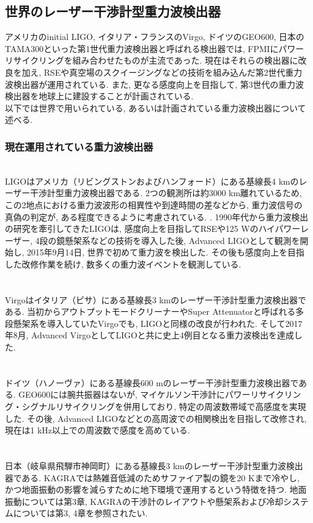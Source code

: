 \subsection{世界のレーザー干渉計型重力波検出器}
アメリカのinitial LIGO, イタリア・フランスのVirgo, ドイツのGEO600, 日本のTAMA300といった第1世代重力波検出器と呼ばれる検出器では, FPMIにパワーリサイクリングを組み合わせたものが主流であった. 現在はそれらの検出器に改良を加え, RSEや真空場のスクイージングなどの技術を組み込んだ第2世代重力波検出器が運用されている. また, 更なる感度向上を目指して, 第3世代の重力波検出器を地球上に建設することが計画されている. \\
\quad 以下では世界で用いられている, あるいは計画されている重力波検出器について述べる. 
\subsubsection{現在運用されている重力波検出器}
\vskip3mm
\noindent
\underline{}\\
\quad LIGOはアメリカ（リビングストンおよびハンフォード）にある基線長4 kmのレーザー干渉計型重力波検出器である\cite{LIGO}. 2つの観測所は約3000 km離れているため, この2地点における重力波波形の相異性や到達時間の差などから, 重力波信号の真偽の判定が, ある程度できるように考慮されている. . 1990年代から重力波検出の研究を牽引してきたLIGOは, 感度向上を目指してRSEや125 Wのハイパワーレーザー, 4段の鏡懸架系などの技術を導入した後, Advanced LIGOとして観測を開始し, 2015年9月14日, 世界で初めて重力波を検出した. その後も感度向上を目指した改修作業を続け, 数多くの重力波イベントを観測している. \\\\
\underline{}\\
\quad Virgoはイタリア（ピサ）にある基線長3 kmのレーザー干渉計型重力波検出器である\cite{Virgo}. 当初からアウトプットモードクリーナーやSuper Attenuator\cite{Virgo}と呼ばれる多段懸架系を導入していたVirgoでも, LIGOと同様の改良が行われた. そして2017年8月, Advanced VirgoとしてLIGOと共に史上4例目となる重力波検出を達成した. \\\\
\underline{}\\
\quad ドイツ（ハノーヴァ）にある基線長600 mのレーザー干渉計型重力波検出器である\cite{GEO}. GEO600には腕共振器はないが, マイケルソン干渉計にパワーリサイクリング・シグナルリサイクリングを併用しており, 特定の周波数帯域で高感度を実現した. その後, Advanced LIGOなどとの高周波での相関検出を目指して改修され, 現在は1 kHz以上での周波数で感度を高めている. \\\\
\underline{}\\
\quad 日本（岐阜県飛騨市神岡町）にある基線長3 kmのレーザー干渉計型重力波検出器である\cite{KAGRA}. KAGRAでは熱雑音低減のためサファイア製の鏡を20 Kまで冷やし, かつ地面振動の影響を減らすために地下環境で運用するという特徴を持つ. 地面振動については第3章, KAGRAの干渉計のレイアウトや懸架系および冷却システムについては第3, 4章を参照されたい. 
